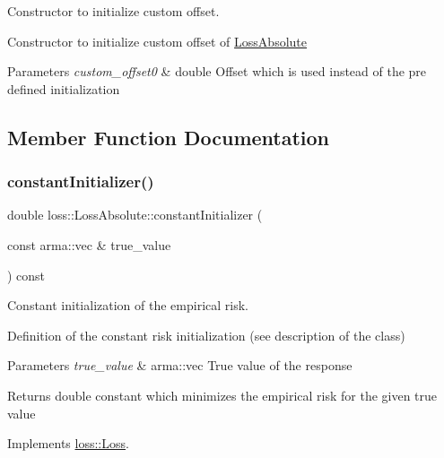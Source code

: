 Constructor to initialize custom offset. 

Constructor to initialize custom offset of {\ttfamily \hyperlink{classloss_1_1_loss_absolute}{Loss\+Absolute}}


\begin{DoxyParams}{Parameters}
{\em custom\+\_\+offset0} & {\ttfamily double} Offset which is used instead of the pre defined initialization \\
\hline
\end{DoxyParams}


\subsection{Member Function Documentation}
\mbox{\label{classloss_1_1_loss_absolute_a5272a952bf768a7bd790318b2f9cdcd6}} 
\subsubsection{\texorpdfstring{constant\+Initializer()}{constantInitializer()}}
{\footnotesize\ttfamily double loss\+::\+Loss\+Absolute\+::constant\+Initializer (\begin{DoxyParamCaption}\item[{const arma\+::vec \&}]{true\+\_\+value }\end{DoxyParamCaption}) const\hspace{0.3cm}{\ttfamily [virtual]}}



Constant initialization of the empirical risk. 

Definition of the constant risk initialization (see description of the class)


\begin{DoxyParams}{Parameters}
{\em true\+\_\+value} & {\ttfamily arma\+::vec} True value of the response\\
\hline
\end{DoxyParams}
\begin{DoxyReturn}{Returns}
{\ttfamily double} constant which minimizes the empirical risk for the given true value 
\end{DoxyReturn}


Implements \hyperlink{classloss_1_1_loss_a65fe7dcd9370e6a549b8d1cc95fc8798}{loss\+::\+Loss}.

